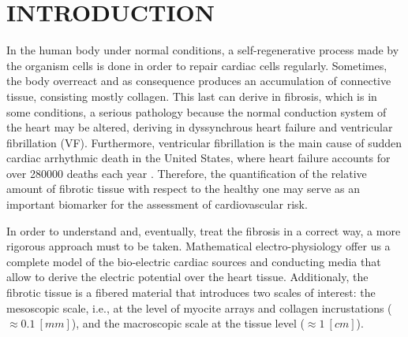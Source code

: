 \documentclass[letterpaper, 11pt, twoside]{article}
\begin{document}



\setcounter{page}{1}
\fontsize{11}{12}\selectfont

\tableofcontents
\newpage





\newpage

\section{INTRODUCTION}

In the human body under normal conditions, a self-regenerative process made by the organism  cells is done in order to repair cardiac cells regularly. Sometimes, the body overreact and as consequence produces an accumulation of connective tissue, consisting mostly collagen. This last can derive in fibrosis, which is in some conditions, a serious pathology because the normal conduction system of the heart may be altered, deriving in dyssynchrous heart failure and ventricular fibrillation (VF). Furthermore, ventricular fibrillation is the main cause of sudden cardiac arrhythmic death \cite{Myeburg_cardiac_sudden_death} in the United States, where heart failure accounts for over 280000 deaths each year \cite{American_heart_association_stathistics}. Therefore, the quantification of the relative amount of fibrotic tissue with respect to the healthy one may serve as an important biomarker for the assessment of cardiovascular risk.

In order to understand and, eventually, treat the fibrosis in a correct way, a more rigorous approach must to be taken. Mathematical electro-physiology offer us a complete model of the bio-electric cardiac sources and conducting media that allow to derive the electric potential over the heart tissue. Additionaly, the fibrotic tissue is a fibered material that introduces two scales of interest: the mesoscopic scale, i.e., at the level of myocite arrays and collagen incrustations ($\approx 0.1~[mm]$), and the macroscopic scale at the tissue level ($\approx 1 ~[cm]$).
\end{document}
